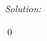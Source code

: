 \documentclass[12pt,a4paper]{article}
\newenvironment{sol}
    {\emph{Solution:}
    }
    {
    \qed
    }
\begin{document}
\begin{sol}
\begin{itemize}


\end{itemize}
\end{sol}
\end{document}
